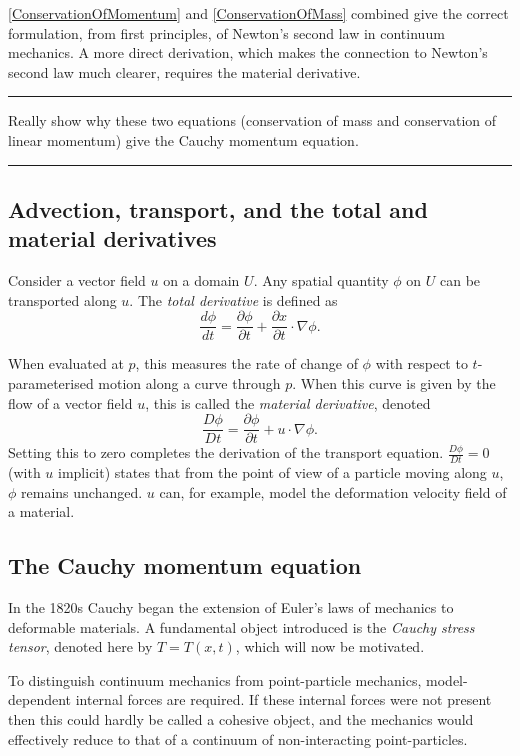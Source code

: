 \documentclass{article}
\newcommand{\todo}[1]{\vskip 0.1in \hrule \vskip 0.03in {#1} \vskip 0.03in \hrule \vskip 0.1in}
\begin{document}
\eqref{ConservationOfMomentum} and \eqref{ConservationOfMass} combined give the correct formulation, from first principles, of Newton's second law in continuum mechanics.
A more direct derivation, which makes the connection to Newton's second law much clearer, requires the material derivative.

\todo{
Really show why these two equations (conservation of mass and conservation of linear momentum) give
the Cauchy momentum equation.
}

\subsection{Advection, transport, and the total and material derivatives} %
Consider a vector field $u$ on a domain $U$. Any spatial quantity $\phi$ on $U$ can be transported along $u$.
The \textit{total derivative} is defined as
    $$\frac{d\phi}{dt} = \frac{\partial \phi}{\partial t} + \frac{\partial x}{\partial t} \cdot \nabla \phi.$$

When evaluated at $p$, this measures the rate of change of $\phi$ with respect to $t$-parameterised motion along a curve through $p$.
When this curve is given by the flow of a vector field $u$, this is called the \textit{material derivative}, denoted
    $$\frac{D\phi}{Dt} = \frac{\partial \phi}{\partial t} + u\cdot \nabla \phi.$$
Setting this to zero completes the derivation of the transport equation. $\frac{D \phi}{Dt} = 0$ (with $u$ implicit) states that from the point of view of
a particle moving along $u$, $\phi$ remains unchanged. $u$ can, for example, model the deformation velocity field of a material.
\subsection{The Cauchy momentum equation} %
In the 1820s Cauchy began the extension of Euler's laws of mechanics to deformable materials.
A fundamental object introduced is the \textit{Cauchy stress tensor}, denoted here by $T = T(x, t)$, which will now be motivated.

To distinguish continuum mechanics from point-particle mechanics, model-dependent internal forces are required. If these internal forces
were not present then this could hardly be called a cohesive object, and the mechanics would effectively reduce to that of a continuum of non-interacting point-particles.
\end{document}
